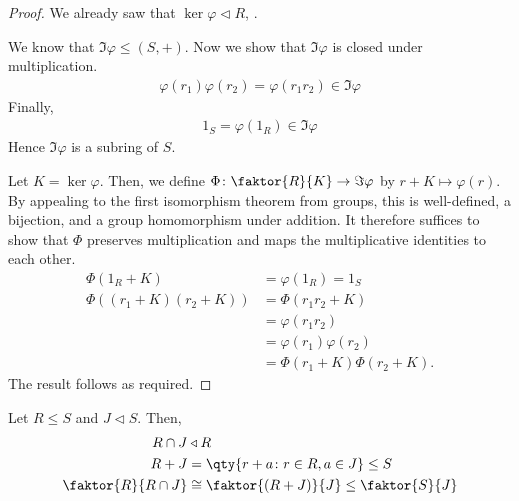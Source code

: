 \begin{proof}
	We already saw that $\ker \varphi \triangleleft R$, .

	We know that $\Im \varphi \leq (S, +)$.
	Now we show that $\Im \varphi$ is closed under multiplication.
	\begin{align*}
		\varphi(r_1) \varphi(r_2) = \varphi(r_1 r_2) \in \Im \varphi
	\end{align*}
	Finally,
	\begin{align*}
		1_S = \varphi(1_R) \in \Im \varphi
	\end{align*}
	Hence $\Im \varphi$ is a subring of $S$.

	Let $K = \ker \varphi$.
	Then, we define $\Phi \colon \faktor{R}{K} \to \Im \varphi$ by $r+K \mapsto \varphi(r)$.
	By appealing to the first isomorphism theorem from groups, this is well-defined, a bijection, and a group homomorphism under addition.
	It therefore suffices to show that $\Phi$ preserves multiplication and maps the multiplicative identities to each other.
	\begin{align*}
		\Phi(1_R + K) &= \varphi(1_R) = 1_S \\
		\Phi((r_1+K)(r_2+K)) &= \Phi(r_1 r_2 +K) \\
		&= \varphi(r_1 r_2) \\
		&= \varphi(r_1) \varphi(r_2) \\
		&= \Phi(r_1 + K) \Phi(r_2 + K).
	\end{align*}
	The result follows as required.
\end{proof}

\begin{theorem}
	Let $R \leq S$ and $J \triangleleft S$.
	Then,
	\begin{align*}
		R \cap J &\triangleleft R \\
		R + J &= \qty{r+a \colon r\in R, a \in J} \leq S \\
		\faktor{R}{R \cap J} &\cong \faktor{(R+J)}{J} \leq \faktor{S}{J}
	\end{align*}
\end{theorem}

